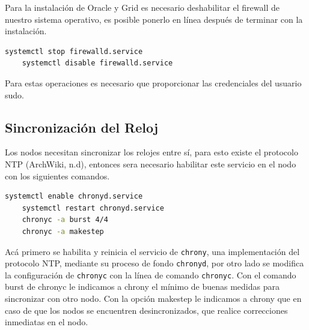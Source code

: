 \documentclass{article}
\begin{document}
Para la instalación de Oracle y Grid es necesario deshabilitar el firewall de nuestro sistema operativo, es posible ponerlo en línea después de terminar con la instalación.

\begin{lstlisting}[style=mystyle,language=bash]
	systemctl stop firewalld.service
	systemctl disable firewalld.service
\end{lstlisting}

Para estas operaciones es necesario que proporcionar las credenciales del usuario sudo.

\subsection{Sincronización del Reloj}

Los nodos necesitan sincronizar los relojes entre sí, para esto existe el protocolo NTP (ArchWiki, n.d), entonces sera necesario habilitar este servicio en el nodo con los siguientes comandos.

\begin{lstlisting}[style=mystyle,language=bash]
	systemctl enable chronyd.service
	systemctl restart chronyd.service
	chronyc -a burst 4/4
	chronyc -a makestep
\end{lstlisting}

Acá primero se habilita y reinicia el servicio de \texttt{chrony}, una implementación del protocolo NTP, mediante su proceso de fondo \texttt{chronyd}, por otro lado se modifica la configuración de \texttt{chronyc} con la línea de comando \texttt{chronyc}.
Con el comando burst de chronyc le indicamos a chrony el mínimo de buenas medidas para sincronizar con otro nodo. Con la opción makestep le indicamos a chrony que en caso de que los nodos se encuentren desincronizados, que realice correcciones inmediatas en el nodo.
\end{document}
